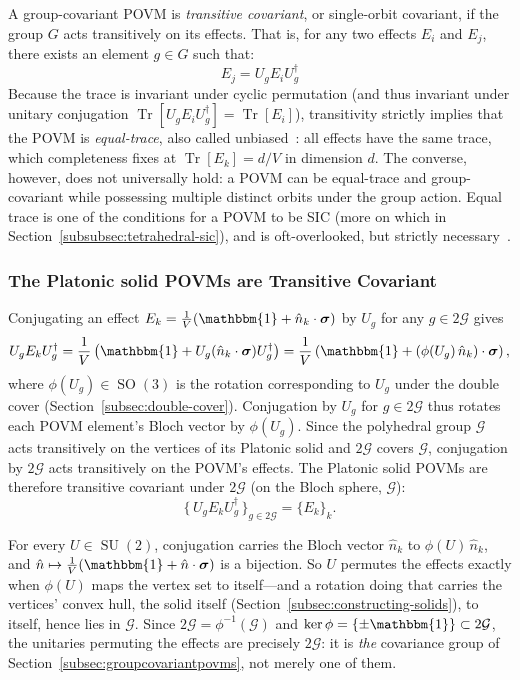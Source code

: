 \documentclass[11pt, oneside, openany]{scrbook}
\DeclareMathOperator{\SU}{SU}
\DeclareMathOperator{\SO}{SO}
\DeclareMathOperator{\Tr}{Tr}
\newcommand{\Id}{\mathbbm{1}}
\newcommand{\sigmavec}{\boldsymbol{\sigma}}
\newcommand{\Ggroup}{\mathcal{G}}
\newcommand{\TwoG}{2\Ggroup}
\begin{document}
A group-covariant POVM is \textit{transitive covariant}, or single-orbit covariant, if the group $G$ acts transitively on its effects. That is, for any two effects $E_i$ and $E_j$, there exists an element $g \in G$ such that:
$$ E_j = U_g E_i U_g^\dagger $$
Because the trace is invariant under cyclic permutation (and thus invariant under unitary conjugation $\Tr[U_g E_i U_g^\dagger] = \Tr[E_i]$), transitivity strictly implies that the POVM is \textit{equal-trace}, also called unbiased~\cite{liu2021relatingmeasurementdisturbance}: all effects have the same trace, which completeness fixes at $\Tr[E_k] = d / V$ in dimension $d$. The converse, however, does not universally hold: a POVM can be equal-trace and group-covariant while possessing multiple distinct orbits under the group action. Equal trace is one of the conditions for a POVM to be SIC (more on which in Section~\ref{subsubsec:tetrahedral-sic}), and is oft-overlooked, but strictly necessary~\cite{geng2021whatareminimal}.

\subsubsection{The Platonic solid POVMs are Transitive Covariant} \label{subsubsec:platonic-transitive}

Conjugating an effect $E_k = \frac{1}{V}(\Id + \hat{n}_k \cdot \sigmavec)$ by $U_g$ for any $g \in \TwoG$ gives
\[
U_g E_k U_g^\dagger = \frac{1}{V} \left( \Id + U_g (\hat{n}_k \cdot \sigmavec) U_g^\dagger \right) = \frac{1}{V} \left( \Id + (\phi(U_g)\, \hat{n}_k) \cdot \sigmavec \right),
\]
where $\phi(U_g) \in \SO(3)$ is the rotation corresponding to $U_g$ under the double cover (Section~\ref{subsec:double-cover}). Conjugation by $U_g$ for $g \in \TwoG$ thus rotates each POVM element's Bloch vector by $\phi(U_g)$. Since the polyhedral group $\Ggroup$ acts transitively on the vertices of its Platonic solid and $\TwoG$ covers $\Ggroup$, conjugation by $\TwoG$ acts transitively on the POVM's effects. The Platonic solid POVMs are therefore transitive covariant under $\TwoG$ (on the Bloch sphere, $\Ggroup$):
\[
  \{\, U_g E_k U_g^\dagger \,\}_{g \in \TwoG} = \{ E_k \}_k.
\]

For every $U \in \SU(2)$, conjugation carries the Bloch vector $\hat{n}_k$ to $\phi(U)\,\hat{n}_k$, and $\hat{n} \mapsto \frac{1}{V}(\Id + \hat{n} \cdot \sigmavec)$ is a bijection. So $U$ permutes the effects exactly when $\phi(U)$ maps the vertex set to itself---and a rotation doing that carries the vertices' convex hull, the solid itself (Section~\ref{subsec:constructing-solids}), to itself, hence lies in $\Ggroup$. Since $\TwoG = \phi^{-1}(\Ggroup)$ and $\ker\phi = \{\pm\Id\} \subset \TwoG$, the unitaries permuting the effects are precisely $\TwoG$: it is \textit{the} covariance group of Section~\ref{subsec:groupcovariantpovms}, not merely one of them.
\end{document}
